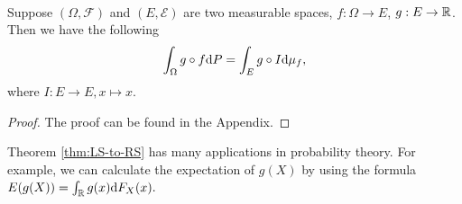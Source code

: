 %
%
%
%




\begin{Theorem}\label{thm:LS-to-RS} \ \\
Suppose $(\Omega, \mathcal{F})$ and $(E, \mathcal{E})$ are two measurable spaces, $f: \Omega \to E$, $g: E \to \mathbb{R}$. Then we have the following
\begin{eqnarray}\label{thm:changeofmeasure}
\int_\Omega g \circ f \mathrm{d} P = \int_E  g \circ I \mathrm{d} \mu_f,
\end{eqnarray}
where $I: E \to E, x \mapsto x$.
\end{Theorem}
\begin{proof}
The proof can be found in the Appendix.
\end{proof}

Theorem \ref{thm:LS-to-RS} has many applications in probability theory. For example, we can calculate the expectation of $g(X)$ by using the formula $E(g(X)) = \int_{\mathbb{R}} g(x) \mathrm{d} F_X(x).$

